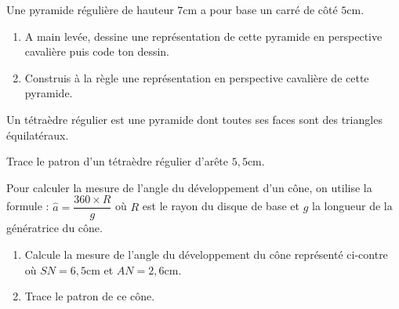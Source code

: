 \documentclass[a4paper,10pt]{report}
\begin{document}
\begin{ex}
Une pyramide régulière de hauteur $7$cm a pour base un carré de côté $5$cm.
\begin{enumerate}[font=\color{exer1}]
\item A main levée, dessine une représentation de cette pyramide en perspective cavalière puis code ton dessin.
\item Construis à la règle une représentation en perspective cavalière de cette pyramide.
\end{enumerate}
\end{ex}

\begin{ex}
Un tétraèdre régulier est une pyramide dont toutes ses faces sont des triangles équilatéraux.

\medskip
\noindent Trace le patron d'un tétraèdre régulier d'arête $5,5$cm.
\end{ex}

\begin{ex}
Pour calculer la mesure de l'angle du développement d'un cône, on utilise la formule : $\widehat{a}=\dfrac{360 \times R}{g}$ où $R$ est le rayon du disque de base et $g$ la longueur de la génératrice du cône.
\begin{enumerate}[font=\color{exer1}]
\item Calcule la mesure de l'angle du développement du cône représenté ci-contre où $SN=6,5$cm et $AN=2,6$cm.
\item Trace le patron de ce cône.
\end{enumerate}
\end{ex}
\end{document}
